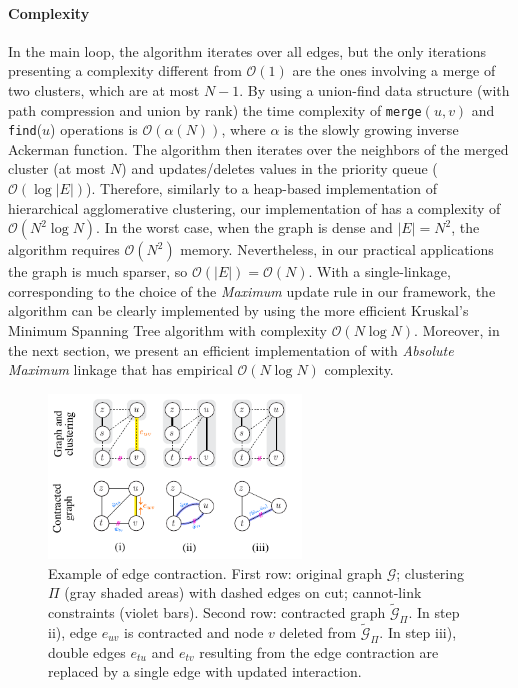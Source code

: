 \paragraph*{Complexity} In the main loop, the algorithm iterates over all edges, but the only iterations presenting a complexity different from $\mathcal{O}(1)$ are the ones involving a merge of two clusters, which are at most $N-1$. By using a union-find data structure (with path compression and union by rank) the time complexity of \texttt{merge}$(u, v)$ and \texttt{find}($u$) operations is $\mathcal{O}(\alpha(N))$, where $\alpha$ is the slowly growing inverse Ackerman function. The algorithm then iterates over the neighbors of the merged cluster (at most $N$) and updates/deletes values in the priority queue ($\mathcal{O}(\log |E|)$). 
Therefore, similarly to a heap-based implementation of hierarchical agglomerative clustering, our implementation of \algname{} has a complexity of $\mathcal{O}(N^2 \log N)$. In the worst case, when the graph is dense and $|E|=N^2$, the algorithm requires $\mathcal{O}(N^2)$ memory. Nevertheless, in our practical applications the graph is much sparser, so $\mathcal{O}(|E|)=\mathcal{O}(N)$. 
With a single-linkage, corresponding to the choice of the \emph{Maximum} update rule in our framework, the algorithm can be clearly implemented by using the more efficient Kruskal's Minimum Spanning Tree algorithm with complexity $\mathcal{O}(N \log N)$. 
Moreover, in the next section, we present an efficient implementation of \algname{} with \emph{Absolute Maximum} linkage that has empirical $\mathcal{O}(N \log N)$ complexity. %
\begin{figure}[H]
        \centering
        \includegraphics[width=0.6\textwidth]{./figs/edge_contraction.pdf} %
    \centering
    \caption{Example of edge contraction. First row: original graph $\mathcal{G}$; clustering $\Pi$ (gray shaded areas) with dashed edges on cut; cannot-link constraints (violet bars). Second row: contracted graph $\tilde{\mathcal{G}}_\Pi$. In step ii), edge $e_{uv}$ is contracted and node $v$ deleted from $\tilde{\mathcal{G}}_\Pi$. In step iii), double edges $e_{tu}$ and $e_{tv}$ resulting from the edge contraction are replaced by a single edge with updated interaction.}\label{fig:edge_contraction_and_contr_graph}  
\end{figure}
